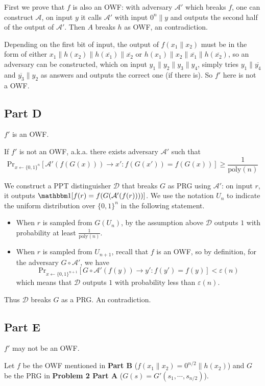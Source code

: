 \documentclass[8pt]{article}
\theoremstyle{compact}
\def\ge{\geqslant}
\begin{document}
First we prove that $f$ is also an OWF: with adversary $\mathcal A'$ which breaks $f$, one can construct $\mathcal A$, on input $y$ it calls $\mathcal A'$ with input $0^n\|y$ and outputs the second half of the output of $\mathcal A'$. Then $A$ breaks $h$ as OWF, an contradiction.

Depending on the first bit of input, the output of $f(x_1 \| x_2)$ must be in the form of either $x_1 \| h(x_2) \| h(\overline{x_1}) \| \overline{x_2}$ or $h(x_1) \| x_2 \| \overline{x_1} \| h(\overline{x_2})$, so an adversary can be constructed, which on input $y_1 \| y_2 \| y_3 \| y_4$, simply tries $y_1 \| \overline{y_4}$ and $\overline{y_3} \| y_2$ as answers and outputs the correct one (if there is). So $f'$ here is not a OWF.
\subsection*{Part D}
$f'$ is an OWF.

If $f'$ is not an OWF, a.k.a. there exists adversary $\mathcal A'$ such that $$\text{Pr}_{x \gets \{0, 1\}^n} [\mathcal A'(f(G(x))) \to x': f(G(x')) = f(G(x))] \ge \frac{1}{\text{poly}(n)}$$

We construct a PPT distinguisher $\mathcal D$ that breaks $G$ as PRG using $\mathcal A'$: on input $r$, it outputs $\mathbbm 1[f(r) = f(G(\mathcal A'(f(r))))]$. We use the notation $U_n$ to indicate the uniform distribution over $\{0, 1\}^n$ in the following statement.

\begin{itemize}
	\item When $r$ is sampled from $G(U_n)$, by the assumption above $\mathcal D$ outputs $1$ with probability at least $\frac{1}{\text{poly}(n)}$.
	\item When $r$ is sampled from $U_{n+1}$, recall that $f$ is an OWF, so by definition, for the adversary $G \circ \mathcal A'$, we have $$\text{Pr}_{x \gets \{0, 1\}^{n+1}}[G \circ \mathcal A'(f(y)) \to y': f(y') = f(y)] < \varepsilon(n)$$ which means that $\mathcal D$ outputs $1$ with probability less than $\varepsilon(n)$.
\end{itemize}

Thus $\mathcal D$ breaks $G$ as a PRG. An contradiction.
\subsection*{Part E}
$f'$ may not be an OWF.

Let $f$ be the OWF mentioned in \textbf{Part B} ($f(x_1 \| x_2) = 0^{n/2} \| h(x_2)$) and $G$ be the PRG in \textbf{Problem 2 Part A} ($G(s) = G'(s_1, \cdots, s_{n/2})$).
\end{document}
